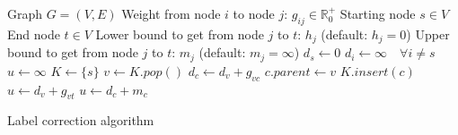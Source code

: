 \documentclass{article}
\begin{document}
\begin{preview}
    \begin{algorithm}[H]
        \begin{algorithmic}
        \Require
        \Statex Graph $G = (V, E)$
        \Statex Weight from node $i$ to node $j$: $g_{ij} \in \mathbb{R}_0^+$
        \Statex Starting node $s \in V$
        \Statex End node $t \in V$
        \Statex Lower bound to get from node $j$ to $t$: $h_j$ (default: $h_j = 0$)
        \Statex Upper bound to get from node $j$ to $t$: $m_j$ (default: $m_j = \infty$)
            \State $d_s \gets 0$
            \State $d_i \gets \infty \quad \forall i \neq s$ 
            \State $u \gets \infty$ 
            \State $K \gets \{s\}$ 
                \State $v \gets K.pop()$
                        \State $d_c \gets d_v + g_{vc}$
                        \State $c.parent \gets v$
                            \State $K.insert(c)$
                        \EndIf
                            \State $u \gets d_v + g_{vt}$
                        \EndIf
                    \EndIf
                        \State $u \gets d_c + m_c$
                    \EndIf
                \EndFor
            \EndWhile
        \EndProcedure
        \end{algorithmic}
    \caption{Label correction algorithm}
    \label{alg:label-correction-algorithm}
    \end{algorithm}
\end{preview}
\end{document}
